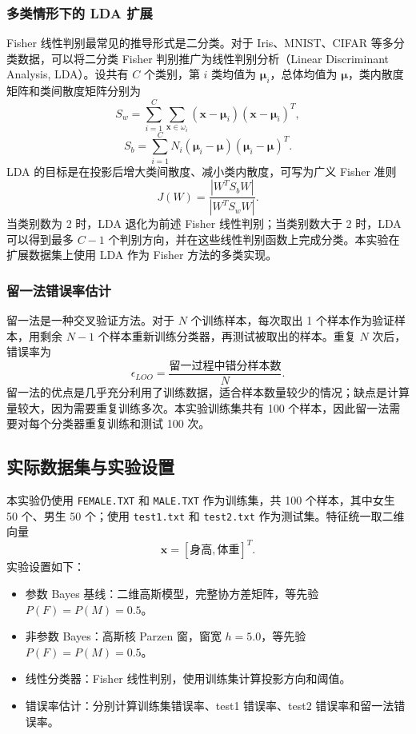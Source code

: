\documentclass[UTF8,a4paper,12pt]{ctexart}
\begin{document}
\subsubsection{多类情形下的 LDA 扩展}

Fisher 线性判别最常见的推导形式是二分类。对于 Iris、MNIST、CIFAR 等多分类数据，可以将二分类 Fisher 判别推广为线性判别分析（Linear Discriminant Analysis, LDA）。设共有 $C$ 个类别，第 $i$ 类均值为 $\boldsymbol{\mu}_i$，总体均值为 $\boldsymbol{\mu}$，类内散度矩阵和类间散度矩阵分别为
\[
S_w=\sum_{i=1}^{C}\sum_{\boldsymbol{x}\in\omega_i}
(\boldsymbol{x}-\boldsymbol{\mu}_i)(\boldsymbol{x}-\boldsymbol{\mu}_i)^T,
\]
\[
S_b=\sum_{i=1}^{C}N_i
(\boldsymbol{\mu}_i-\boldsymbol{\mu})(\boldsymbol{\mu}_i-\boldsymbol{\mu})^T.
\]
LDA 的目标是在投影后增大类间散度、减小类内散度，可写为广义 Fisher 准则
\[
J(W)=\frac{|W^TS_bW|}{|W^TS_wW|}.
\]
当类别数为 2 时，LDA 退化为前述 Fisher 线性判别；当类别数大于 2 时，LDA 可以得到最多 $C-1$ 个判别方向，并在这些线性判别函数上完成分类。本实验在扩展数据集上使用 LDA 作为 Fisher 方法的多类实现。

\subsubsection{留一法错误率估计}

留一法是一种交叉验证方法。对于 $N$ 个训练样本，每次取出 1 个样本作为验证样本，用剩余 $N-1$ 个样本重新训练分类器，再测试被取出的样本。重复 $N$ 次后，错误率为
\[
\epsilon_{LOO}=\frac{\text{留一过程中错分样本数}}{N}.
\]
留一法的优点是几乎充分利用了训练数据，适合样本数量较少的情况；缺点是计算量较大，因为需要重复训练多次。本实验训练集共有 100 个样本，因此留一法需要对每个分类器重复训练和测试 100 次。

\subsection{实际数据集与实验设置}

本实验仍使用 \texttt{FEMALE.TXT} 和 \texttt{MALE.TXT} 作为训练集，共 100 个样本，其中女生 50 个、男生 50 个；使用 \texttt{test1.txt} 和 \texttt{test2.txt} 作为测试集。特征统一取二维向量
\[
\boldsymbol{x}=[\text{身高},\text{体重}]^T.
\]
实验设置如下：
\begin{itemize}
  \item 参数 Bayes 基线：二维高斯模型，完整协方差矩阵，等先验 $P(F)=P(M)=0.5$。
  \item 非参数 Bayes：高斯核 Parzen 窗，窗宽 $h=5.0$，等先验 $P(F)=P(M)=0.5$。
  \item 线性分类器：Fisher 线性判别，使用训练集计算投影方向和阈值。
  \item 错误率估计：分别计算训练集错误率、test1 错误率、test2 错误率和留一法错误率。
\end{itemize}
\end{document}
